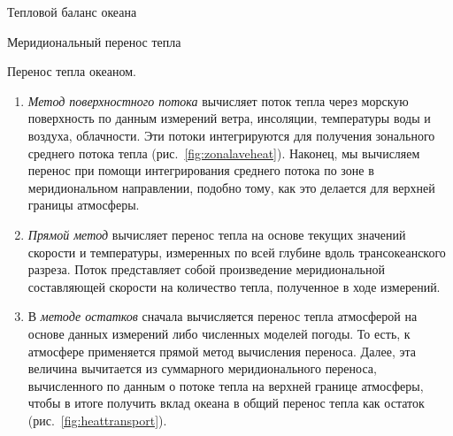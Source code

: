 \begin{chapter}{Тепловой баланс океана}
\begin{section}{Меридиональный перенос тепла}
\begin{paragraph}{Перенос тепла океаном.}
\begin{enumerate}
\item
\emph{Метод поверхностного потока} вычисляет поток тепла через морскую
поверхность по данным измерений ветра, инсоляции, температуры воды и воздуха,
облачности. Эти потоки интегрируются для получения зонального среднего потока
тепла (рис.~\ref{fig:zonalaveheat}). Наконец, мы вычисляем перенос при 
помощи интегрирования среднего потока по зоне в меридиональном направлении, 
подобно тому, как это делается для верхней границы атмосферы.
%

\item
\emph{Прямой метод} вычисляет перенос тепла на основе текущих значений 
скорости и температуры, измеренных по всей глубине вдоль трансокеанского
разреза. Поток представляет собой произведение меридиональной
составляющей скорости на количество тепла, полученное в ходе измерений.
%

\item
В \emph{методе остатков} сначала вычисляется перенос тепла атмосферой на
основе данных измерений либо численных моделей погоды. То есть, к атмосфере
применяется прямой метод вычисления переноса. Далее, эта величина
вычитается из суммарного меридионального переноса, вычисленного по данным
о потоке тепла на верхней границе атмосферы, чтобы в итоге получить вклад
океана в общий перенос тепла как остаток (рис.~\ref{fig:heattransport}).
%
\end{enumerate}


\end{paragraph}
\end{section}
\end{chapter}
